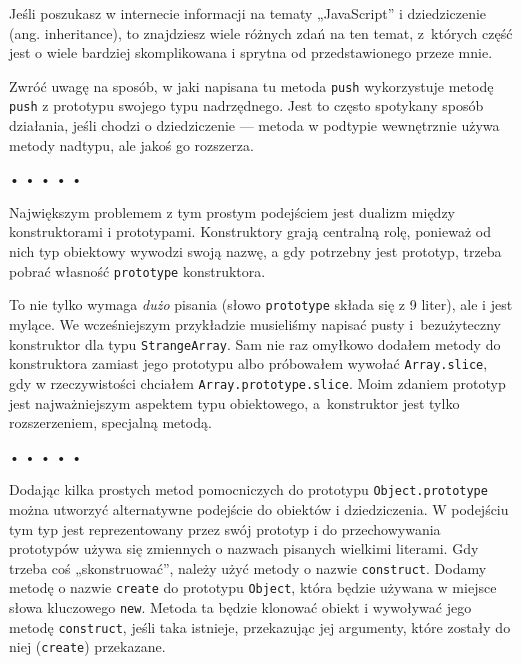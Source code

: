 Jeśli poszukasz w internecie informacji na tematy „JavaScript” i dziedziczenie (ang. inheritance), to znajdziesz wiele różnych zdań na ten temat, z~których część jest o wiele bardziej skomplikowana i sprytna od przedstawionego przeze mnie.

  
Zwróć uwagę na sposób, w jaki napisana tu metoda \texttt{push} wykorzystuje metodę \texttt{push} z prototypu swojego typu nadrzędnego. Jest to często spotykany sposób działania, jeśli chodzi o dziedziczenie — metoda w podtypie wewnętrznie używa metody nadtypu, ale jakoś go rozszerza.



\begin{center}
• • • • •
\end{center}

  
Największym problemem z tym prostym podejściem jest dualizm między konstruktorami i prototypami. Konstruktory grają centralną rolę, ponieważ od nich typ obiektowy wywodzi swoją nazwę, a gdy potrzebny jest prototyp, trzeba pobrać własność \texttt{prototype} konstruktora.

  
To nie tylko wymaga \emph{dużo} pisania (słowo \texttt{prototype} składa się z 9 liter), ale i jest mylące. We wcześniejszym przykładzie musieliśmy napisać pusty i~bezużyteczny konstruktor dla typu \texttt{StrangeArray}. Sam nie raz omyłkowo dodałem metody do konstruktora zamiast jego prototypu albo próbowałem wywołać \texttt{Array.slice}, gdy w rzeczywistości chciałem \texttt{Array.prototype.slice}. Moim zdaniem prototyp jest najważniejszym aspektem typu obiektowego, a~konstruktor jest tylko rozszerzeniem, specjalną metodą.



\begin{center}
• • • • •
\end{center}

  
Dodając kilka prostych metod pomocniczych do prototypu \texttt{Object.prototype} można utworzyć alternatywne podejście do obiektów i dziedziczenia. W podejściu tym typ jest reprezentowany przez swój prototyp i do przechowywania prototypów używa się zmiennych o nazwach pisanych wielkimi literami. Gdy trzeba coś „skonstruować”, należy użyć metody o nazwie \texttt{construct}. Dodamy metodę o nazwie \texttt{create} do prototypu \texttt{Object}, która będzie używana w miejsce słowa kluczowego \texttt{new}. Metoda ta będzie klonować obiekt i wywoływać jego metodę \texttt{construct}, jeśli taka istnieje, przekazując jej argumenty, które zostały do niej (\texttt{create}) przekazane.

